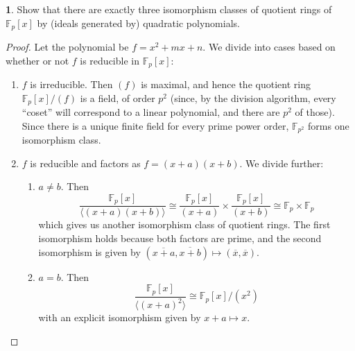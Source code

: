 \documentclass{book}
\newcommand{\F}{\mathbb F}
\theoremstyle{definition}
\theoremstyle{block}
\newtheorem{block*}[block]{}
\theoremstyle{thm}
\begin{document}
\begin{block*}
  Show that there are exactly three isomorphism classes of quotient rings of
  $\F_p[x]$ by (ideals generated by) quadratic polynomials.
\end{block*}

\begin{proof}
  Let the polynomial be $f = x^2+mx+n$. We divide into cases based on whether or not
  $f$ is reducible in $\F_p[x]$:
  \begin{enumerate}
    \item $f$ is irreducible. Then $(f)$ is maximal, and hence the quotient ring
      $\F_p[x]/(f)$ is a field, of order $p^2$ (since, by the division
      algorithm, every ``coset'' will correspond to a linear polynomial, and there
      are $p^2$ of those). Since there is a unique finite field for every prime
      power order, $\F_{p^2}$ forms one isomorphism class.
    \item $f$ is reducible and factors as $f = (x+a)(x+b)$. We divide further:
      \begin{enumerate}
        \item $a \neq b$. Then
          \[\frac{\F_p[x]}{\langle {(x+a)(x+b)} \rangle} \cong
            \frac{\F_p[x]}{(x+a)}\times\frac{\F_p[x]}{(x+b)} \cong
            \F_p\times\F_p\]
          which gives us another isomorphism class of quotient rings.
          The first isomorphism holds because both factors are prime, and the
          second isomorphism is given by $(\overline{x+a},\overline{x+b})\mapsto
          (\overline x, \overline x)$.
        \item $a = b$. Then
          \[\frac{\F_p[x]}{\langle (x+a)^2 \rangle}\cong \F_p[x]/(x^2)
          \]
          with an explicit isomorphism given by $x+a\mapsto x$.
      \end{enumerate}
  \end{enumerate}
\end{proof}
\end{document}
